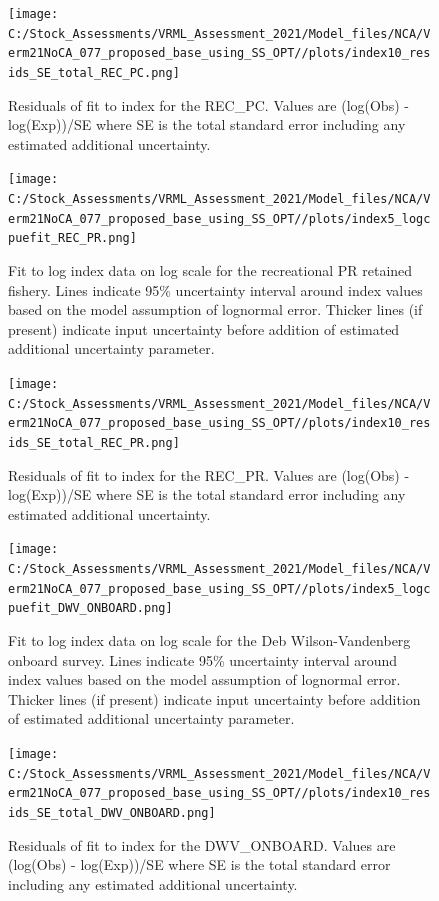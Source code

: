 \documentclass[
  english,
  a4paper,
]{article}
\begin{document}
\begin{figure}
\centering
\texttt{[image: C:/Stock\_Assessments/VRML\_Assessment\_2021/Model\_files/NCA/Verm21NoCA\_077\_proposed\_base\_using\_SS\_OPT//plots/index10\_resids\_SE\_total\_REC\_PC.png]}
\caption{Residuals of fit to index for the REC\_PC. Values are (log(Obs) - log(Exp))/SE where SE is the total standard error including any estimated additional uncertainty.\label{fig:cpue-resid-REC-PC}}
\end{figure}

\begin{figure}
\centering
\texttt{[image: C:/Stock\_Assessments/VRML\_Assessment\_2021/Model\_files/NCA/Verm21NoCA\_077\_proposed\_base\_using\_SS\_OPT//plots/index5\_logcpuefit\_REC\_PR.png]}
\caption{Fit to log index data on log scale for the recreational PR retained fishery. Lines indicate 95\% uncertainty interval around index values based on the model assumption of lognormal error. Thicker lines (if present) indicate input uncertainty before addition of estimated additional uncertainty parameter.\label{fig:log-cpue-REC-PR}}
\end{figure}

\begin{figure}
\centering
\texttt{[image: C:/Stock\_Assessments/VRML\_Assessment\_2021/Model\_files/NCA/Verm21NoCA\_077\_proposed\_base\_using\_SS\_OPT//plots/index10\_resids\_SE\_total\_REC\_PR.png]}
\caption{Residuals of fit to index for the REC\_PR. Values are (log(Obs) - log(Exp))/SE where SE is the total standard error including any estimated additional uncertainty.\label{fig:cpue-resid-REC-PR}}
\end{figure}

\begin{figure}
\centering
\texttt{[image: C:/Stock\_Assessments/VRML\_Assessment\_2021/Model\_files/NCA/Verm21NoCA\_077\_proposed\_base\_using\_SS\_OPT//plots/index5\_logcpuefit\_DWV\_ONBOARD.png]}
\caption{Fit to log index data on log scale for the Deb Wilson-Vandenberg onboard survey. Lines indicate 95\% uncertainty interval around index values based on the model assumption of lognormal error. Thicker lines (if present) indicate input uncertainty before addition of estimated additional uncertainty parameter.\label{fig:log-cpue-DWV-ONBOARD}}
\end{figure}

\begin{figure}
\centering
\texttt{[image: C:/Stock\_Assessments/VRML\_Assessment\_2021/Model\_files/NCA/Verm21NoCA\_077\_proposed\_base\_using\_SS\_OPT//plots/index10\_resids\_SE\_total\_DWV\_ONBOARD.png]}
\caption{Residuals of fit to index for the DWV\_ONBOARD. Values are (log(Obs) - log(Exp))/SE where SE is the total standard error including any estimated additional uncertainty.\label{fig:cpue-resid-DWV-ONBOARD}}
\end{figure}
\end{document}
